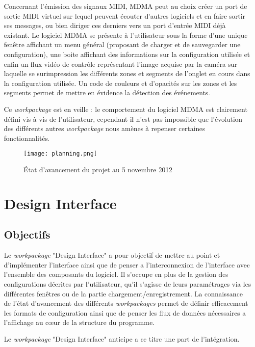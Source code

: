 \par Concernant l'émission des signaux MIDI, MDMA peut au choix créer un port de sortie MIDI virtuel sur lequel peuvent écouter d'autres logiciels et en faire sortir ses messages, ou bien diriger ces derniers vers un port d'entrée MIDI déjà existant.
Le logiciel MDMA se présente à l'utilisateur sous la forme d'une unique fenêtre affichant un menu général (proposant de charger et de sauvegarder une configuration), une boite affichant des informations sur la configuration utilisée et enfin un flux vidéo de contrôle représentant l'image acquise par la caméra sur laquelle se surimpression les différents zones et  segments de l'onglet en cours dans la configuration utilisée. Un code de couleurs et d'opacités sur les zones et les segments permet de mettre en évidence la détection des événements.
\par Ce \emph{workpackage} est en veille : le comportement du logiciel MDMA est clairement défini vis-à-vis de l'utilisateur, cependant il n'est pas impossible que l'évolution des différents autres \emph{workpackage} nous amènes à repenser certaines fonctionnalités.
\begin{figure}
	\centering
	\texttt{[image: planning.png]}
    \caption{État d'avancement du projet au 5 novembre 2012}
\end{figure}



\section{Design Interface}
\subsection{Objectifs}
\par Le \emph{workpackage} "Design Interface" a pour objectif de mettre au point et d'implémenter l'interface ainsi que de penser a l'interconnexion de l'interface avec l'ensemble des composants du logiciel. Il s'occupe en plus de la gestion des configurations décrites par l'utilisateur, qu'il s'agisse de leurs paramétrages via les différentes fenêtres ou de la partie chargement/enregistrement. La connaissance de l'état d'avancement des différents \emph{workpackages} permet de définir efficacement les formats de configuration ainsi que de penser les flux de données nécessaires a l'affichage au cœur de la structure du programme.
\par Le \emph{workpackage} "Design Interface" anticipe a ce titre une part de l'intégration.
